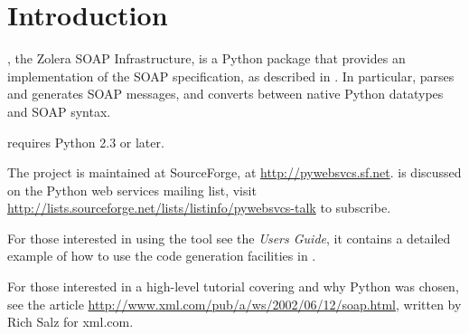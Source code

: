 \chapter{Introduction}

\ZSI{}, the Zolera SOAP Infrastructure, is a Python package that
provides an implementation of the SOAP specification, as described in
.
In particular, \ZSI{} parses and generates SOAP messages, and
converts between native Python datatypes and SOAP syntax.

 requires Python 2.3 or later.

The  project is maintained at SourceForge, at
\url{http://pywebsvcs.sf.net}.
\ZSI{} is discussed on the Python web services mailing list, visit
\url{http://lists.sourceforge.net/lists/listinfo/pywebsvcs-talk}
to subscribe.

For those interested in using the  tool see the \emph{Users
Guide}, it contains a detailed example of how to use the code generation
facilities in .

For those interested in a high-level tutorial covering \ZSI{} and why
Python was chosen, see the article
\url{http://www.xml.com/pub/a/ws/2002/06/12/soap.html},
written by Rich Salz for xml.com.

